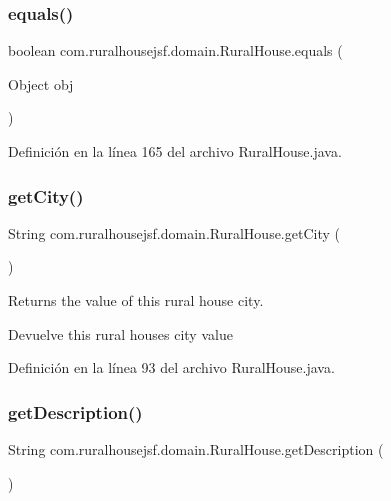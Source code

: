 \subsubsection{\texorpdfstring{equals()}{equals()}}
{\footnotesize\ttfamily boolean com.\+ruralhousejsf.\+domain.\+Rural\+House.\+equals (\begin{DoxyParamCaption}\item[{Object}]{obj }\end{DoxyParamCaption})}



Definición en la línea 165 del archivo Rural\+House.\+java.

\mbox{\label{classcom_1_1ruralhousejsf_1_1domain_1_1_rural_house_acb17324965fdc86c270d1b2dc7624083}} 
\subsubsection{\texorpdfstring{getCity()}{getCity()}}
{\footnotesize\ttfamily String com.\+ruralhousejsf.\+domain.\+Rural\+House.\+get\+City (\begin{DoxyParamCaption}{ }\end{DoxyParamCaption})}

Returns the value of this rural house city.

\begin{DoxyReturn}{Devuelve}
this rural houses city value 
\end{DoxyReturn}


Definición en la línea 93 del archivo Rural\+House.\+java.

\mbox{\label{classcom_1_1ruralhousejsf_1_1domain_1_1_rural_house_a3d4f77d4ff2e8ca9527bb86816dc1174}} 
\subsubsection{\texorpdfstring{getDescription()}{getDescription()}}
{\footnotesize\ttfamily String com.\+ruralhousejsf.\+domain.\+Rural\+House.\+get\+Description (\begin{DoxyParamCaption}{ }\end{DoxyParamCaption})}

